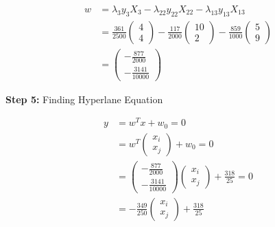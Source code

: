 \documentclass[12pt]{report}
\begin{document}
\begin{equation}
	\begin{aligned}
		w & = \lambda_{3}y_{3}X_{3} - \lambda_{22}y_{22}X_{22} - \lambda_{13}y_{13}X_{13}                                                                                                                  \\
		  & = \frac{361}{2500}\begin{pmatrix}4                                      \\ 4\end{pmatrix}-\frac{117}{2000}\begin{pmatrix}10\\ 2\end{pmatrix}-\frac{859}{1000}\begin{pmatrix}5\\ 9\end{pmatrix} \\
		  & = \begin{pmatrix}-\frac{877}{2000}                                      \\ -\frac{3141}{10000}\end{pmatrix}
	\end{aligned}
\end{equation}


\vspace{20pt}

\textbf{Step 5:} Finding Hyperlane Equation

\begin{equation}
	\begin{aligned}
		y & = w^Tx + w_{0} = 0                                                                                                                      \\
		  & = w^T\begin{pmatrix}x_{i}              \\x_{j}\end{pmatrix} + w_{0} = 0                                                                 \\
		  & = \begin{pmatrix}-\frac{877}{2000}     \\ -\frac{3141}{10000}\end{pmatrix}\begin{pmatrix}x_{i}\\x_{j}\end{pmatrix} + \frac{318}{25} = 0 \\
		  & = -\frac{349}{250}\begin{pmatrix}x_{i} \\x_{j}\end{pmatrix} + \frac{318}{25}
	\end{aligned}
\end{equation}
\end{document}
